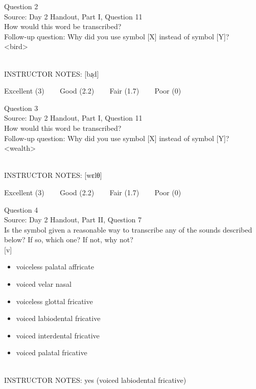 \documentclass[12pt]{article}
\begin{document}
{\large Question 2}\\

Source: Day 2 Handout, Part I, Question 11\\

How would this word be transcribed?\\ Follow-up question: Why did you use symbol [X] instead of symbol [Y]?\\

<bird>


~\\
INSTRUCTOR NOTES: [bɹ̩d]


\vfill
Excellent (3) ~~~ Good (2.2) ~~~ Fair (1.7) ~~~ Poor (0)
\newpage

{\large Question 3}\\

Source: Day 2 Handout, Part I, Question 11\\

How would this word be transcribed?\\ Follow-up question: Why did you use symbol [X] instead of symbol [Y]?\\

<wealth>


~\\
INSTRUCTOR NOTES: [wɛlθ]


\vfill
Excellent (3) ~~~ Good (2.2) ~~~ Fair (1.7) ~~~ Poor (0)
\newpage

{\large Question 4}\\

Source: Day 2 Handout, Part II, Question 7\\

Is the symbol given a reasonable way to transcribe any of the sounds described below? If so, which one? If not, why not?\\

{[v]}

\begin{itemize} \item voiceless palatal affricate \item voiced velar nasal \item voiceless glottal fricative \item voiced labiodental fricative \item voiced interdental fricative \item voiced palatal fricative \end{itemize}


~\\
INSTRUCTOR NOTES: yes (voiced labiodental fricative)
\end{document}
